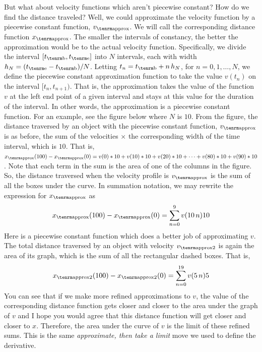 But what about velocity functions which aren't piecewise constant? 
How do we find the distance traveled? Well, we could approximate the velocity
function by a piecewise constant function, $v_{\rm approx}$. We will call 
the corresponding distance function $x_{\rm approx}$.
The smaller the intervals of 
constancy, the better the approximation would be to the actual velocity 
function. Specifically, we divide the interval $[t_{\rm b}, t_{\rm e}]$ 
into $N$ intervals, each with width $h_N = (t_{\rm e} - t_{\rm b}) / N$. 
Letting $t_n = t_{\rm b} + n \, h_N$, for $n = 0, 1, \ldots, N$, we define
the piecewise constant approximation function to take the value
$v(t_n)$ on the interval $[t_n, t_{n+1})$. That is, the approximation takes 
the value of the function $v$ at the left end point of a given interval and stays at this 
value for the duration of the interval. In other words, the approximation is a piecewise constant function.
For an example, see the figure below where $N$ is $10$.
From the figure, the distance traversed by an object with the piecewise constant 
function, $v_{\rm approx}$ is as before, the sum of the velocities $\times$ the 
corresponding width of the time interval, which is $10$. That is, 
$x_{\rm approx}(100) - x_{\rm approx}(0) = v(0) * 10 + v(10) * 10 + 
v(20) * 10 + \cdots +
v(80) * 10 + v(90) * 10$.
Note that each term in the sum is the area of one of the columns in the figure. 
So, the distance traversed when the velocity profile is $v_{\rm approx}$ is the sum of all the 
boxes under the curve. 
In summation notation, we may rewrite the expression for $x_{\rm approx}$ as
$$
x_{\rm approx}(100) - x_{\rm approx}(0) = \sum_{n=0}^{9} v(10\,n) 10
$$
Here is a piecewise constant function which does a better job of 
approximating $v$.
The total distance traversed by an object with velocity $v_{\rm approx2}$ is again the area of its 
graph, which is the sum of all the rectangular dashed boxes. That is,
$$
x_{\rm approx2}(100) - x_{\rm approx2}(0) = \sum_{n=0}^{19} v(5\,n) 5
$$
You can see that if we make more refined 
approximations to $v$, the value of the corresponding distance function 
gets closer and closer to the area 
under the graph of $v$ and I hope you would agree that this distance function 
will get closer and closer to $x$.
Therefore, the area under the curve of $v$ is the limit of these refined
sums. This is the same {\it approximate, then take a limit\/} move we
used to define the derivative.
